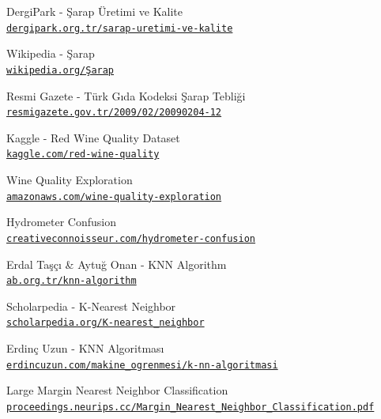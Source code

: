 \documentclass[conference]{IEEEtran}
\begin{document}
\newpage
\begin{thebibliography}{22}

DergiPark - Şarap Üretimi ve Kalite
\\\texttt{\href{https://dergipark.org.tr/tr/download/article-file/498270}{\nolinkurl{dergipark.org.tr/sarap-uretimi-ve-kalite}}}

Wikipedia - Şarap
\\\texttt{\href{https://tr.wikipedia.org/wiki/Şarap}{\nolinkurl{wikipedia.org/Şarap}}}

Resmi Gazete - Türk Gıda Kodeksi Şarap Tebliği
\\\texttt{\href{https://www.resmigazete.gov.tr/eskiler/2009/02/20090204-12.htm}{\nolinkurl{resmigazete.gov.tr/2009/02/20090204-12}}}

Kaggle - Red Wine Quality Dataset
\\\texttt{\href{https://www.kaggle.com/uciml/red-wine-quality-cortez-et-al-2009}{\nolinkurl{kaggle.com/red-wine-quality}}}

Wine Quality Exploration
\\\texttt{\href{http://rstudio-pubs-static.s3.amazonaws.com/80458_5000e31f84df449099a872ccf40747b7.html}{\nolinkurl{amazonaws.com/wine-quality-exploration}}}

Hydrometer Confusion
\\\texttt{\href{http://www.creativeconnoisseur.com/newsletter/files/497deafe6be1b2efc87df8ac6071e459-162.html}{\nolinkurl{creativeconnoisseur.com/hydrometer-confusion}}}

Erdal Taşçı \& Aytuğ Onan - KNN Algorithm
\\\texttt{\href{https://ab.org.tr/ab16/bildiri/102.pdf}{\nolinkurl{ab.org.tr/knn-algorithm}}}

Scholarpedia - K-Nearest Neighbor
\\\texttt{\href{http://scholarpedia.org/article/K-nearest_neighbor}{\nolinkurl{scholarpedia.org/K-nearest_neighbor}}}

Erdinç Uzun - KNN Algoritması
\\\texttt{\href{https://erdincuzun.com/makine_ogrenmesi/k-nn-algoritmasi/}{\nolinkurl{erdincuzun.com/makine_ogrenmesi/k-nn-algoritmasi}}}

Large Margin Nearest Neighbor Classification
\\\texttt{\href{https://proceedings.neurips.cc/paper/2005/file/a7f592cef8b130a6967a90617db5681b-Paper.pdf}{\nolinkurl{proceedings.neurips.cc/Margin_Nearest_Neighbor_Classification.pdf}}}


\end{thebibliography}
\end{document}
